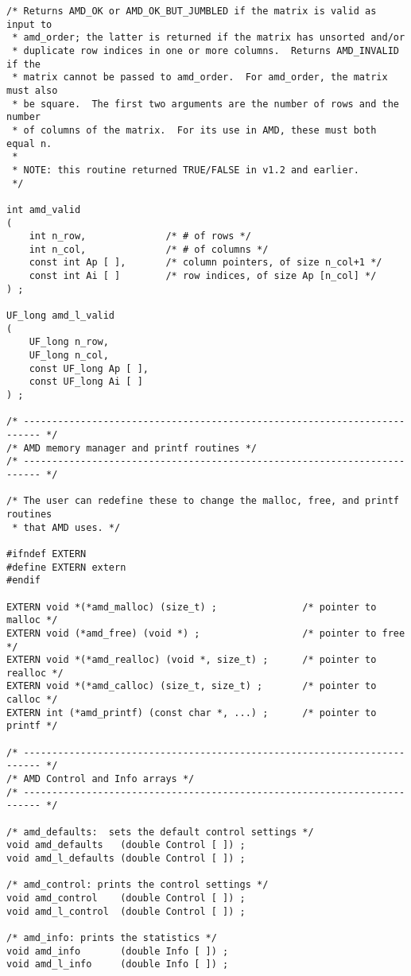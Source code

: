 \documentclass[11pt]{article}
\begin{document}
{\begin{verbatim}
/* Returns AMD_OK or AMD_OK_BUT_JUMBLED if the matrix is valid as input to
 * amd_order; the latter is returned if the matrix has unsorted and/or
 * duplicate row indices in one or more columns.  Returns AMD_INVALID if the
 * matrix cannot be passed to amd_order.  For amd_order, the matrix must also
 * be square.  The first two arguments are the number of rows and the number
 * of columns of the matrix.  For its use in AMD, these must both equal n.
 *
 * NOTE: this routine returned TRUE/FALSE in v1.2 and earlier.
 */

int amd_valid
(
    int n_row,              /* # of rows */
    int n_col,              /* # of columns */
    const int Ap [ ],       /* column pointers, of size n_col+1 */
    const int Ai [ ]        /* row indices, of size Ap [n_col] */
) ;

UF_long amd_l_valid
(
    UF_long n_row,
    UF_long n_col,
    const UF_long Ap [ ],
    const UF_long Ai [ ]
) ;

/* ------------------------------------------------------------------------- */
/* AMD memory manager and printf routines */
/* ------------------------------------------------------------------------- */

/* The user can redefine these to change the malloc, free, and printf routines
 * that AMD uses. */

#ifndef EXTERN
#define EXTERN extern
#endif

EXTERN void *(*amd_malloc) (size_t) ;               /* pointer to malloc */
EXTERN void (*amd_free) (void *) ;                  /* pointer to free */
EXTERN void *(*amd_realloc) (void *, size_t) ;      /* pointer to realloc */
EXTERN void *(*amd_calloc) (size_t, size_t) ;       /* pointer to calloc */
EXTERN int (*amd_printf) (const char *, ...) ;      /* pointer to printf */

/* ------------------------------------------------------------------------- */
/* AMD Control and Info arrays */
/* ------------------------------------------------------------------------- */

/* amd_defaults:  sets the default control settings */
void amd_defaults   (double Control [ ]) ;
void amd_l_defaults (double Control [ ]) ;

/* amd_control: prints the control settings */
void amd_control    (double Control [ ]) ;
void amd_l_control  (double Control [ ]) ;

/* amd_info: prints the statistics */
void amd_info       (double Info [ ]) ;
void amd_l_info     (double Info [ ]) ;


\end{verbatim}}
\end{document}
